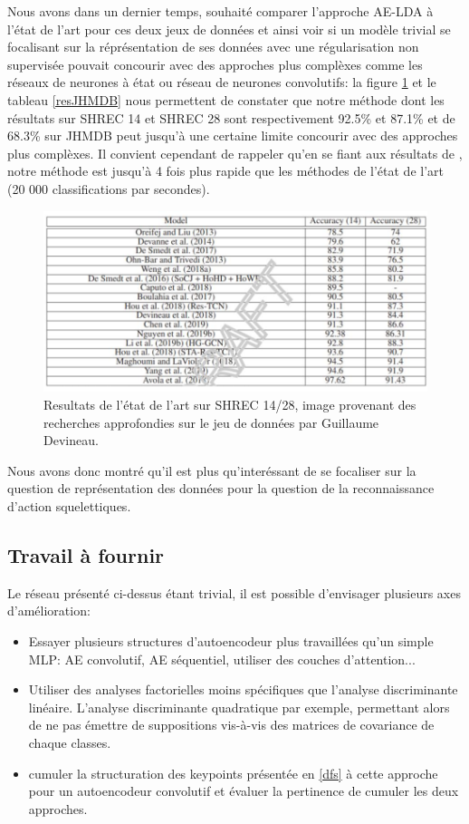 Nous avons dans un dernier temps, souhaité comparer l'approche AE-LDA à l'état de l'art pour ces deux jeux de données et ainsi voir si un modèle trivial se focalisant sur la réprésentation de ses données avec une régularisation non supervisée pouvait concourir avec des approches plus complèxes comme les réseaux de neurones à état ou réseau de neurones convolutifs: la figure \ref{fig:tabguillaume} et le tableau \ref{resJHMDB} nous permettent de constater que notre méthode dont les résultats sur SHREC 14 et SHREC 28 sont respectivement 92.5\% et 87.1\% et de 68.3\% sur JHMDB peut jusqu'à une certaine limite concourir avec des approches plus complèxes. Il convient cependant de rappeler qu'en se fiant aux résultats de \cite{2019arXiv190709658Y}, notre méthode est jusqu'à 4 fois plus rapide que les méthodes de l'état de l'art (20 000 classifications par secondes).

\begin{figure}[H]
    \centering
    \includegraphics[width=0.8\linewidth]{Images/guillaume_TAB.png}
    \caption{Resultats de l'état de l'art sur SHREC 14/28, image provenant des recherches approfondies sur le jeu de données par Guillaume Devineau. }
    \label{fig:tabguillaume}
\end{figure}\textbf{}

Nous avons donc montré qu'il est plus qu'interéssant de se focaliser sur la question de représentation des données pour la question de la reconnaissance d'action squelettiques.


\subsection{Travail à fournir}
Le réseau présenté ci-dessus étant trivial, il est possible d'envisager plusieurs axes d'amélioration:

\begin{itemize}
    \item Essayer plusieurs structures d'autoencodeur plus travaillées qu'un simple MLP: AE convolutif, AE séquentiel, utiliser des couches d'attention...
    \item Utiliser des analyses factorielles moins spécifiques que l'analyse discriminante linéaire. L'analyse discriminante quadratique par exemple, permettant alors de ne pas émettre de suppositions vis-à-vis des matrices de covariance de chaque classes. 
    \item cumuler la structuration des keypoints présentée en \ref{dfs} à cette approche pour un autoencodeur convolutif et évaluer la pertinence de cumuler les deux approches.
\end{itemize}

